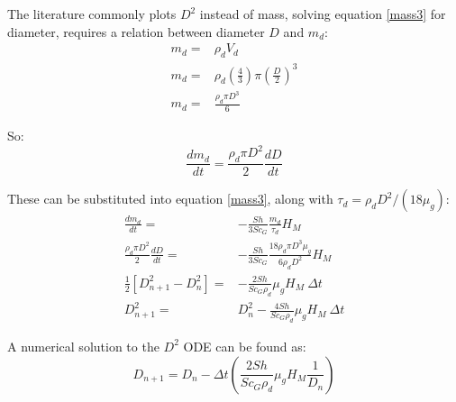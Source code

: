 \documentclass[../Interim_Report_Master]{subfiles}
\begin{document}
%

The literature commonly plots $D^2$ instead of mass, solving equation \ref{mass3} for diameter, requires a relation between diameter $D$ and $m_d$:
\begin{subequations}
	\begin{align}
	m_d =& \rho_d V_d \\
	m_d =& \rho_d \left(\frac{4}{3}\right) \pi \left(\frac{D}{2}\right)^3 \\
	m_d =& \frac{\rho_d \pi D^3}{6}
	\end{align}
	\label{mass_diameter}
\end{subequations}

So:
\begin{equation}
\frac{dm_d}{dt} = \frac{\rho_d \pi D^2}{2}\frac{dD}{dt}
\end{equation}

These can be substituted into equation \ref{mass3}, along with $\tau_d = \rho_d D^2/(18\mu_g)$:
\begin{subequations}
\begin{align}
\frac{dm_d}{dt} =& -\frac{Sh}{3Sc_G}\frac{m_d}{\tau_d}H_M \\
\frac{\rho_d \pi D^2}{2}\frac{dD}{dt} =& -\frac{Sh}{3Sc_G}\frac{18 \rho_d \pi D^3 \mu_g}{6\rho_d D^2}H_M \\
\frac{1}{2}\left[D^2_{n+1} - D^2_n\right] =& -\frac{2Sh}{Sc_G\rho_d }\mu_g H_M ~\Delta t \\
D^2_{n+1} =& D_n^2 -\frac{4Sh}{Sc_G\rho_d }\mu_g H_M ~\Delta t
\end{align}
\end{subequations}

A numerical solution to the $D^2$ ODE can be found as:
\begin{equation}
D_{n+1} = D_n-\Delta t\left(\frac{2Sh}{Sc_G\rho_d }\mu_g H_M \frac{1}{D_n}\right)
\end{equation}
\end{document}

